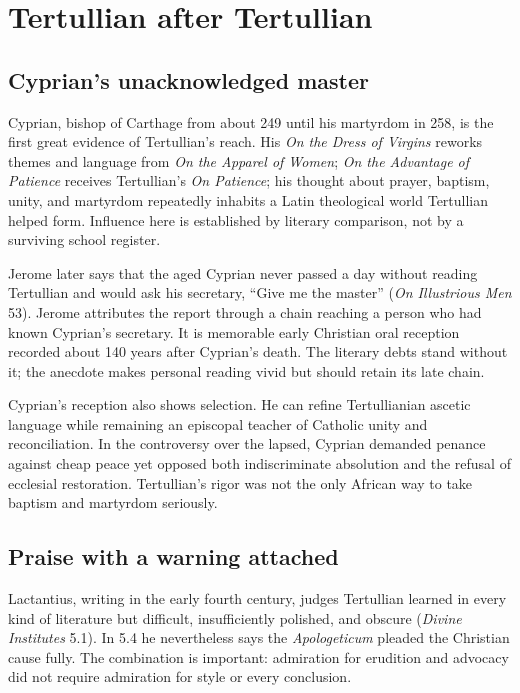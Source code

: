 \section{Tertullian after Tertullian}

\subsection{Cyprian's unacknowledged master}

Cyprian, bishop of Carthage from about 249 until his martyrdom in 258, is the
first great evidence of Tertullian's reach. His \emph{On the Dress of Virgins}
reworks themes and language from \emph{On the Apparel of Women}; \emph{On the
Advantage of Patience} receives Tertullian's \emph{On Patience}; his thought
about prayer, baptism, unity, and martyrdom repeatedly inhabits a Latin
theological world Tertullian helped form. Influence here is established by
literary comparison, not by a surviving school register.

Jerome later says that the aged Cyprian never passed a day without reading
Tertullian and would ask his secretary, ``Give me the master'' (\emph{On
Illustrious Men} 53). Jerome attributes the report through a chain reaching a
person who had known Cyprian's secretary. It is memorable early Christian oral
reception recorded about 140 years after Cyprian's death. The literary debts
stand without it; the anecdote makes personal reading vivid but should retain
its late chain.

Cyprian's reception also shows selection. He can refine Tertullianian ascetic
language while remaining an episcopal teacher of Catholic unity and
reconciliation. In the controversy over the lapsed, Cyprian demanded penance
against cheap peace yet opposed both indiscriminate absolution and the refusal
of ecclesial restoration. Tertullian's rigor was not the only African way to
take baptism and martyrdom seriously.

\subsection{Praise with a warning attached}

Lactantius, writing in the early fourth century, judges Tertullian learned in
every kind of literature but difficult, insufficiently polished, and obscure
(\emph{Divine Institutes} 5.1). In 5.4 he nevertheless says the
\emph{Apologeticum} pleaded the Christian cause fully. The combination is
important: admiration for erudition and advocacy did not require admiration for
style or every conclusion.

